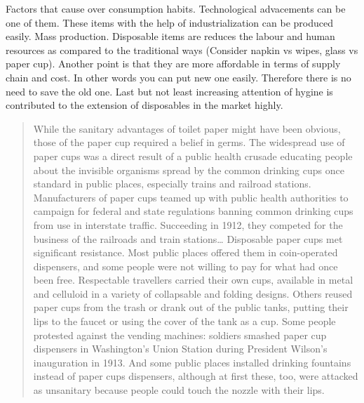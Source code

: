 %
%
\comment{[Factors.]}
Factors that cause over consumption habits. Technological advacements can be one of them. These items with the help of industrialization can be produced easily. Mass production. Disposable items are reduces the labour and human resources as compared to the traditional ways (Consider napkin vs wipes, glass vs paper cup). Another point is that they are more affordable in terms of supply chain and cost. In other words you can put new one easily. Therefore there is no need to save the old one. Last but not least increasing attention of hygine is contributed to the extension of disposables in the market highly.  


\begin{quote}
While the sanitary advantages of toilet paper might have been obvious, those of the paper cup required a belief in germs. The widespread use of paper cups was a direct result of a public health crusade educating people about the invisible organisms spread by the common drinking cups once standard in public places, especially trains and railroad stations. Manufacturers of paper cups teamed up with public health authorities to campaign for federal and state regulations banning common drinking cups from use in interstate traffic. Succeeding in 1912, they competed for the business of the railroads and train stations\ldots
Disposable paper cups met significant resistance. Most public places offered them in coin-operated dispensers, and some people were not willing to pay for what had once been free. Respectable travellers carried their own cups, available in metal and celluloid in a variety of collapsable and folding designs. Others reused paper cups from the trash or drank out of the public tanks, putting their lips to the faucet or using the cover of the tank as a cup. Some people protested against the vending machines: soldiers smashed paper cup dispensers in Washington’s Union Station during President Wilson’s inauguration in 1913. And some public places installed drinking fountains instead of paper cups dispensers, although at first these, too, were attacked as unsanitary because people could touch the nozzle with their lips.
\end{quote}

